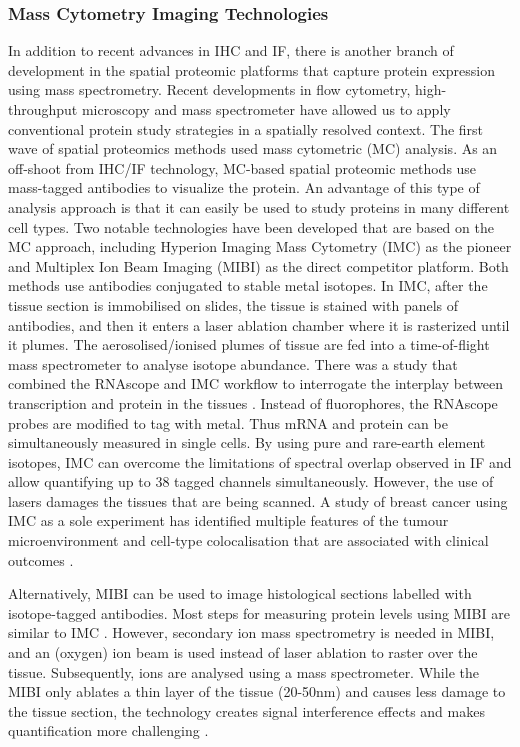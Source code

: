 \subsubsection{Mass Cytometry Imaging Technologies}
In addition to recent advances in IHC and IF, there is another branch of development in the spatial proteomic platforms that capture protein expression using mass spectrometry. Recent developments in flow cytometry, high-throughput microscopy and mass spectrometer have allowed us to apply conventional protein study strategies in a spatially resolved context. The first wave of spatial proteomics methods used mass cytometric (MC) analysis. As an off-shoot from IHC/IF technology, MC-based spatial proteomic methods use mass-tagged antibodies to visualize the protein. An advantage of this type of analysis approach is that it can easily be used to study proteins in many different cell types. Two notable technologies have been developed that are based on the MC approach, including Hyperion Imaging Mass Cytometry (IMC) as the pioneer and Multiplex Ion Beam Imaging (MIBI) as the direct competitor platform. Both methods use antibodies conjugated to stable metal isotopes. In IMC, after the tissue section is immobilised on slides, the tissue is stained with panels of antibodies, and then it enters a laser ablation chamber where it is rasterized until it plumes. The aerosolised/ionised plumes of tissue are fed into a time-of-flight mass spectrometer to analyse isotope abundance. There was a study that combined the RNAscope and IMC workflow to interrogate the interplay between transcription and protein in the tissues  \cite{schulz2018simultaneous}. Instead of fluorophores, the RNAscope probes are modified to tag with metal. Thus mRNA and protein can be simultaneously measured in single cells. By using pure and rare-earth element isotopes, IMC can overcome the limitations of spectral overlap observed in IF and allow quantifying up to 38 tagged channels simultaneously. However, the use of lasers damages the tissues that are being scanned. A study of breast cancer using IMC as a sole experiment has identified multiple features of the tumour microenvironment and cell-type colocalisation that are associated with clinical outcomes \cite{jackson2020single}.

Alternatively, MIBI can be used to image histological sections labelled with isotope-tagged antibodies. Most steps for measuring protein levels using MIBI are similar to IMC \cite{baharlou2019mass}. However, secondary ion mass spectrometry is needed in MIBI, and  an (oxygen) ion beam is used instead of laser ablation to raster over the tissue. Subsequently, ions are analysed using a mass spectrometer. While the MIBI only ablates a thin layer of the tissue (20-50nm) and causes less damage to the tissue section, the technology creates signal interference effects and makes quantification more challenging \cite{bodenmiller2016multiplexed}.

